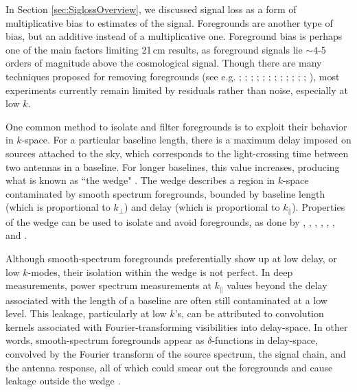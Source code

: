 \documentclass[preprint2,numberedappendix,tighten]{aastex6}
\begin{document}
In Section \ref{sec:SiglossOverview}, we discussed signal loss as a form of multiplicative bias to estimates of the signal. Foregrounds are another type of bias, but an additive instead of a multiplicative one. Foreground bias is perhaps one of the main factors limiting 21\,cm results, as foreground signals lie $\sim4$-$5$ orders of 
magnitude above the cosmological signal. Though there are many techniques proposed for removing foregrounds (see e.g. \citealt{vedantham_et_al2012}; \citealt{chapman_et_al2012}; \citealt{parsons_et_al2012a}; \citealt{parsons_et_al2012b}; \citealt{dillon_et_al2013a}; \citealt{wang_et_al2013}; \citealt{parsons_et_al2014}; \citealt{liu_et_al2014a}; \citealt{wolz_et_al2014}; \citealt{liu_et_al2014b}; \citealt{dillon_et_al2015}; \citealt{pober_et_al2016a}; \citealt{trott_et_al2016}), most 
experiments currently remain limited by residuals rather than noise, especially at low $k$.

One common method to isolate and filter foregrounds is to exploit their behavior in $k$-space. For a particular 
baseline length, there is a maximum delay imposed on sources attached to the sky, which corresponds to the light-crossing time between two 
antennas in a baseline. For longer baselines, this value increases, producing what is known as ``the 
wedge"
\citep{datta_et_al2010, parsons_et_al2012b, vedantham_et_al2012, pober_et_al2013, thyagarajan_et_al2013, liu_et_al2014a, liu_et_al2014b, patil_et_al2017}. 
The wedge describes a region in $k$-space contaminated by smooth spectrum foregrounds, bounded by baseline length (which is proportional to $k_{\perp}$) and delay (which is 
proportional to $k_{\parallel}$). Properties of the wedge can be used to isolate and 
avoid foregrounds, as done by , 
\citet{parsons_et_al2014}, \citet{dillon_et_al2014}, \citet{dillon_et_al2015}, \citet{jacobs_et_al2015}, \citet{beardsley_et_al2016}, and \citet{trott_et_al2016}.

Although smooth-spectrum foregrounds preferentially show up at low delay, or low $k$-modes, their isolation within the wedge is not perfect. In deep measurements, power spectrum measurements at $k_{\parallel}$ values beyond 
the delay associated with the length of a baseline are often still contaminated at a low level. This leakage, particularly at low $k$'s, can be attributed to 
convolution kernels associated with Fourier-transforming visibilities into delay-space. In other words, smooth-spectrum 
foregrounds appear as $\delta$-functions in delay-space, convolved by the Fourier transform of the source spectrum, the signal chain, and the 
antenna response, all of which could smear out the foregrounds and cause leakage outside the wedge \citep[e.g.][]{ewall-wice_et_al2017, kerrigan_et_al2018}.
\end{document}
